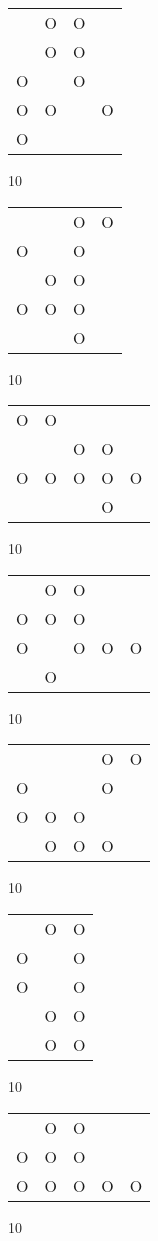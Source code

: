 \begin{tabular}{|m{0.2cm}m{0.2cm}m{0.2cm}m{0.2cm}|}\hline
 &O&O& \\
 &O&O& \\
O& &O& \\
O&O& &O\\
O& & & \\
\hline\end{tabular}10
\begin{tabular}{|m{0.2cm}m{0.2cm}m{0.2cm}m{0.2cm}|}\hline
 & &O&O\\
O& &O& \\
 &O&O& \\
O&O&O& \\
 & &O& \\
\hline\end{tabular}10
\begin{tabular}{|m{0.2cm}m{0.2cm}m{0.2cm}m{0.2cm}m{0.2cm}|}\hline
O&O& & & \\
 & &O&O& \\
O&O&O&O&O\\
 & & &O& \\
\hline\end{tabular}10
\begin{tabular}{|m{0.2cm}m{0.2cm}m{0.2cm}m{0.2cm}m{0.2cm}|}\hline
 &O&O& & \\
O&O&O& & \\
O& &O&O&O\\
 &O& & & \\
\hline\end{tabular}10
\begin{tabular}{|m{0.2cm}m{0.2cm}m{0.2cm}m{0.2cm}m{0.2cm}|}\hline
 & & &O&O\\
O& & &O& \\
O&O&O& & \\
 &O&O&O& \\
\hline\end{tabular}10
\begin{tabular}{|m{0.2cm}m{0.2cm}m{0.2cm}|}\hline
 &O&O\\
O& &O\\
O& &O\\
 &O&O\\
 &O&O\\
\hline\end{tabular}10
\begin{tabular}{|m{0.2cm}m{0.2cm}m{0.2cm}m{0.2cm}m{0.2cm}|}\hline
 &O&O& & \\
O&O&O& & \\
O&O&O&O&O\\
\hline\end{tabular}10
